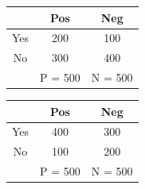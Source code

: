 \begin{center}
\begin{minipage}{0.45\textwidth}
	 \begin{center}
	 \begin{tabular}{|c|c|c|}
		\hline
	 	& Pos & Neg  \\
		\hline
		\hline
	 	Yes & 200 & 100 \\
		\hline
	 	No & 300 & 400 \\
		\hline
	 	   & P =  500 & N = 500 \\
		\hline
	 \end{tabular}
	 \end{center}

\end{minipage}
\hfill
\begin{minipage}{0.45\textwidth}
	 \begin{center}
	 \begin{tabular}{|c|c|c|}
		\hline
	 	& Pos & Neg  \\
		\hline
		\hline
	 	Yes & 400 & 300 \\
		\hline
	 	No & 100 & 200 \\
		\hline
	 	   & P =  500 & N = 500 \\
		\hline
	 \end{tabular}
	 \end{center}
\end{minipage}
\end{center}

